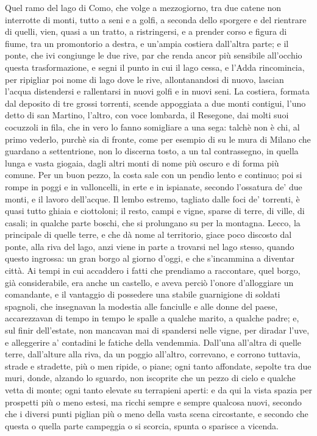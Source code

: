 \documentclass[b5paper]{memoir}
\begin{document}
\beginnumbering
\numberpstarttrue
\pstart
Quel ramo del lago di Como, che volge a mezzogiorno, tra due catene non interrotte di monti, tutto a seni e a golfi, a seconda dello sporgere e del rientrare di quelli, vien, quasi a un tratto, a ristringersi, e a prender corso e figura di fiume, tra un promontorio a destra, e un’ampia costiera dall’altra parte; e il ponte, che ivi congiunge le due rive, par che renda ancor più sensibile all’occhio questa trasformazione, e segni il punto in cui il lago cessa, e l’Adda rincomincia, per ripigliar poi nome di lago dove le rive, allontanandosi di nuovo, lascian l’acqua distendersi e rallentarsi in nuovi golfi e in nuovi seni. La costiera, formata dal deposito di tre grossi torrenti, scende appoggiata a due monti contigui, l’uno detto di san Martino, l’altro, con voce lombarda, il Resegone, dai molti suoi cocuzzoli in fila, che in vero lo fanno somigliare a una sega: talchè non è chi, al primo vederlo, purchè sia di fronte, come per esempio di su le mura di Milano che guardano a settentrione, non lo discerna tosto, a un tal contrassegno, in quella lunga e vasta giogaia, dagli altri monti di nome più oscuro e di forma più comune. Per un buon pezzo, la costa sale con un pendìo lento e continuo; poi si rompe in poggi e in valloncelli, in erte e in ispianate, secondo l’ossatura de’ due monti, e il lavoro dell’acque. Il lembo estremo, tagliato dalle foci de’ torrenti, è quasi tutto ghiaia e ciottoloni; il resto, campi e vigne, sparse di terre, di ville, di casali; in qualche parte boschi, che si prolungano su per la montagna. Lecco, la principale di quelle terre, e che dà nome al territorio, giace poco discosto dal ponte, alla riva del lago, anzi viene in parte a trovarsi nel lago stesso, quando questo ingrossa: un gran borgo al giorno d’oggi, e che s’incammina a diventar città. Ai tempi in cui accaddero i fatti che prendiamo a raccontare, quel borgo, già considerabile, era anche un castello, e aveva perciò l’onore d’alloggiare un comandante, e il vantaggio di possedere una stabile guarnigione di soldati spagnoli, che insegnavan la modestia alle fanciulle e alle donne del paese, accarezzavan di tempo in tempo le spalle a qualche marito, a qualche padre; e, sul finir dell’estate, non mancavan mai di spandersi nelle vigne, per diradar l’uve, e alleggerire a’ contadini le fatiche della vendemmia. Dall’una all’altra di quelle terre, dall’alture alla riva, da un poggio all’altro, correvano, e corrono tuttavia, strade e stradette, più o men ripide, o piane; ogni tanto affondate, sepolte tra due muri, donde, alzando lo sguardo, non iscoprite che un pezzo di cielo e qualche vetta di monte; ogni tanto elevate su terrapieni aperti: e da qui la vista spazia per prospetti più o meno estesi, ma ricchi sempre e sempre qualcosa nuovi, secondo che i diversi punti piglian più o meno della vasta scena circostante, e secondo che questa o quella parte campeggia o si scorcia, spunta o sparisce a vicenda.
\end{document}
